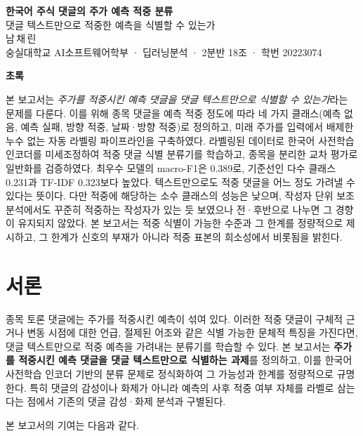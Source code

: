 \documentclass[11pt]{article}
\newenvironment{abstractblock}{%
  \begin{center}\textbf{초록}\end{center}\vspace{-4pt}%
  \begin{list}{}{\setlength{\leftmargin}{1.6em}\setlength{\rightmargin}{1.6em}}\item[]\small}%
  {\end{list}\vspace{2pt}}
\begin{document}
\begin{center}
{\LARGE\bfseries 한국어 주식 댓글의 주가 예측 적중 분류}\\[5pt]
{\large 댓글 텍스트만으로 적중한 예측을 식별할 수 있는가}\\[10pt]
{\normalsize 남\,채\,린}\\[3pt]
{\footnotesize 숭실대학교 AI소프트웨어학부 · 딥러닝분석 · 2분반 18조 · 학번 20223074}
\end{center}
\vspace{6pt}

\begin{abstractblock}
본 보고서는 \emph{주가를 적중시킨 예측 댓글을 댓글 텍스트만으로 식별할 수 있는가}라는 문제를 다룬다. 이를 위해 종목 댓글을 예측 적중 정도에 따라 네 가지 클래스(예측 없음, 예측 실패, 방향 적중, 날짜·방향 적중)로 정의하고, 미래 주가를 입력에서 배제한 누수 없는 자동 라벨링 파이프라인을 구축하였다. 라벨링된 데이터로 한국어 사전학습 인코더를 미세조정하여 적중 댓글 식별 분류기를 학습하고, 종목을 분리한 교차 평가로 일반화를 검증하였다. 최우수 모델의 macro-F1은 0.389로, 기준선인 다수 클래스 0.231과 TF-IDF 0.323보다 높았다. 텍스트만으로도 적중 댓글을 어느 정도 가려낼 수 있다는 뜻이다. 다만 적중에 해당하는 소수 클래스의 성능은 낮으며, 작성자 단위 보조 분석에서도 꾸준히 적중하는 작성자가 있는 듯 보였으나 전·후반으로 나누면 그 경향이 유지되지 않았다. 본 보고서는 적중 식별이 가능한 수준과 그 한계를 정량적으로 제시하고, 그 한계가 신호의 부재가 아니라 적중 표본의 희소성에서 비롯됨을 밝힌다.
\end{abstractblock}

\section{서론}

종목 토론 댓글에는 주가를 적중시킨 예측이 섞여 있다. 이러한 적중 댓글이 구체적 근거나 변동 시점에 대한 언급, 절제된 어조와 같은 식별 가능한 문체적 특징을 가진다면, 댓글 텍스트만으로 적중 예측을 가려내는 분류기를 학습할 수 있다. 본 보고서는 \textbf{주가를 적중시킨 예측 댓글을 댓글 텍스트만으로 식별하는 과제}를 정의하고, 이를 한국어 사전학습 인코더 기반의 분류 문제로 정식화하여 그 가능성과 한계를 정량적으로 규명한다. 특히 댓글의 감성이나 화제가 아니라 예측의 사후 적중 여부 자체를 라벨로 삼는다는 점에서 기존의 댓글 감성·화제 분석과 구별된다.

본 보고서의 기여는 다음과 같다.
\end{document}
